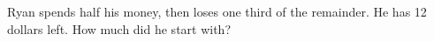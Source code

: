 Ryan spends half his money, then loses one third of the remainder. He has 12 dollars left. How much did he start with?
